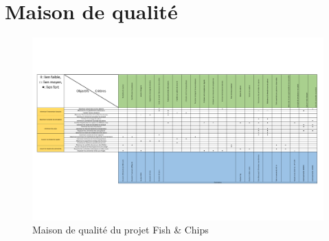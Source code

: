 


\newpage


\section{Maison de qualité}

\begin{figure}[htb!]
    \centering
    \includegraphics[width=\linewidth]{fig/MQ2.pdf}
    \caption{Maison de qualité du projet Fish \& Chips}
    \label{fig:maison_qualite}
\end{figure}
